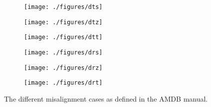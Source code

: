\begin{comment}
\begin{figure}[!htbp]\captionsetup{justification=centering}
  \centering
  \begin{subfigure}{0.32\textwidth}\texttt{[image: ./figures/dts]}\end{subfigure}
  \begin{subfigure}{0.32\textwidth}\texttt{[image: ./figures/dtz]}\end{subfigure}
  \begin{subfigure}{0.32\textwidth}\texttt{[image: ./figures/dtt]}\end{subfigure}
  \begin{subfigure}{0.32\textwidth}\texttt{[image: ./figures/drs]}\end{subfigure}
  \begin{subfigure}{0.32\textwidth}\texttt{[image: ./figures/drz]}\end{subfigure}
  \begin{subfigure}{0.32\textwidth}\texttt{[image: ./figures/drt]}\end{subfigure}
  \caption{\label{fig:misalscheme}The different misalignment cases as defined in the AMDB manual.}
\end{figure}
\end{comment}

\begin{figure}[!htbp]\captionsetup{justification=centering}
  \centering
  \begin{subfigure}{0.32\textwidth}\texttt{[image: ./figures/dts]}\end{subfigure}
  \begin{subfigure}{0.32\textwidth}\texttt{[image: ./figures/dtz]}\end{subfigure}
  \begin{subfigure}{0.32\textwidth}\texttt{[image: ./figures/dtt]}\end{subfigure}
  \begin{subfigure}{0.32\textwidth}\texttt{[image: ./figures/drs]}\end{subfigure}
  \begin{subfigure}{0.32\textwidth}\texttt{[image: ./figures/drz]}\end{subfigure}
  \begin{subfigure}{0.32\textwidth}\texttt{[image: ./figures/drt]}\end{subfigure}
  \caption{\label{fig:misalscheme}The different misalignment cases as defined in the AMDB manual.}
\end{figure}

